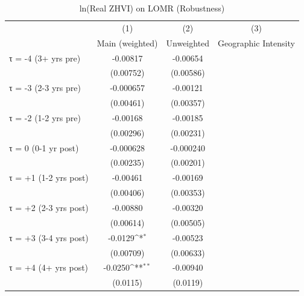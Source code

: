 \begin{table}[htbp]\centering
\def\sym#1{\ifmmode^{#1}\else\(^{#1}\)\fi}
\caption{ln(Real ZHVI) on LOMR (Robustness)}
\begin{tabular}{l*{3}{c}}
\hline\hline
                    &\multicolumn{1}{c}{(1)}&\multicolumn{1}{c}{(2)}&\multicolumn{1}{c}{(3)}\\
                    &\multicolumn{1}{c}{Main (weighted)}&\multicolumn{1}{c}{Unweighted}&\multicolumn{1}{c}{Geographic Intensity}\\
\hline
τ = -4 (3+ yrs pre) &    -0.00817         &    -0.00654         &                     \\
                    &   (0.00752)         &   (0.00586)         &                     \\
[1em]
τ = -3 (2-3 yrs pre)&   -0.000657         &    -0.00121         &                     \\
                    &   (0.00461)         &   (0.00357)         &                     \\
[1em]
τ = -2 (1-2 yrs pre)&    -0.00168         &    -0.00185         &                     \\
                    &   (0.00296)         &   (0.00231)         &                     \\
[1em]
τ = 0 (0-1 yr post) &   -0.000628         &   -0.000240         &                     \\
                    &   (0.00235)         &   (0.00201)         &                     \\
[1em]
τ = +1 (1-2 yrs post)&    -0.00461         &    -0.00169         &                     \\
                    &   (0.00406)         &   (0.00353)         &                     \\
[1em]
τ = +2 (2-3 yrs post)&    -0.00880         &    -0.00320         &                     \\
                    &   (0.00614)         &   (0.00505)         &                     \\
[1em]
τ = +3 (3-4 yrs post)&     -0.0129\sym{*}  &    -0.00523         &                     \\
                    &   (0.00709)         &   (0.00633)         &                     \\
[1em]
τ = +4 (4+ yrs post)&     -0.0250\sym{**} &    -0.00940         &                     \\
                    &    (0.0115)         &    (0.0119)         &                     \\

\end{tabular}
\end{table}
